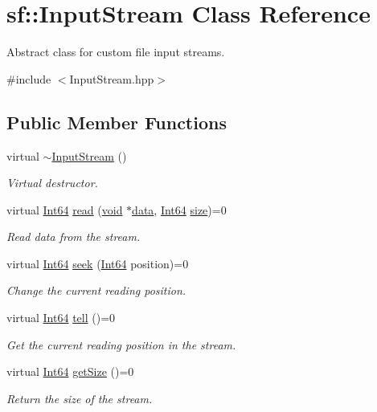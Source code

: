 \hypertarget{classsf_1_1_input_stream}{\section{sf\-:\-:Input\-Stream Class Reference}
\label{classsf_1_1_input_stream}
}


Abstract class for custom file input streams.  




{\ttfamily \#include $<$Input\-Stream.\-hpp$>$}

\subsection*{Public Member Functions}
\begin{DoxyCompactItemize}
\item 
virtual \hyperlink{classsf_1_1_input_stream_a4b2eb0f92323e630bd0542bc6191682e}{$\sim$\-Input\-Stream} ()
\begin{DoxyCompactList}\small\item\em Virtual destructor. \end{DoxyCompactList}\item 
virtual \hyperlink{namespacesf_a2840579fed3494d9f330baf7a5a19903}{Int64} \hyperlink{classsf_1_1_input_stream_a8dd89c74c1acb693203f50e750c6ae53}{read} (\hyperlink{glutf90_8h_ac778d6f63f1aaf8ebda0ce6ac821b56e}{void} $\ast$\hyperlink{gl3_8h_a0f78eecb0891cce3bdfc815b971866a1}{data}, \hyperlink{namespacesf_a2840579fed3494d9f330baf7a5a19903}{Int64} \hyperlink{gl3_8h_a79ef9eb3e59c4bb34c4b9fbeb8d28ff7}{size})=0
\begin{DoxyCompactList}\small\item\em Read data from the stream. \end{DoxyCompactList}\item 
virtual \hyperlink{namespacesf_a2840579fed3494d9f330baf7a5a19903}{Int64} \hyperlink{classsf_1_1_input_stream_a76aba8e5d5cf9b1c5902d5e04f7864fc}{seek} (\hyperlink{namespacesf_a2840579fed3494d9f330baf7a5a19903}{Int64} position)=0
\begin{DoxyCompactList}\small\item\em Change the current reading position. \end{DoxyCompactList}\item 
virtual \hyperlink{namespacesf_a2840579fed3494d9f330baf7a5a19903}{Int64} \hyperlink{classsf_1_1_input_stream_a599515b9ccdbddb6fef5a98424fd559c}{tell} ()=0
\begin{DoxyCompactList}\small\item\em Get the current reading position in the stream. \end{DoxyCompactList}\item 
virtual \hyperlink{namespacesf_a2840579fed3494d9f330baf7a5a19903}{Int64} \hyperlink{classsf_1_1_input_stream_a311eaaaa65d636728e5153b574b72d5d}{get\-Size} ()=0
\begin{DoxyCompactList}\small\item\em Return the size of the stream. \end{DoxyCompactList}\end{DoxyCompactItemize}


